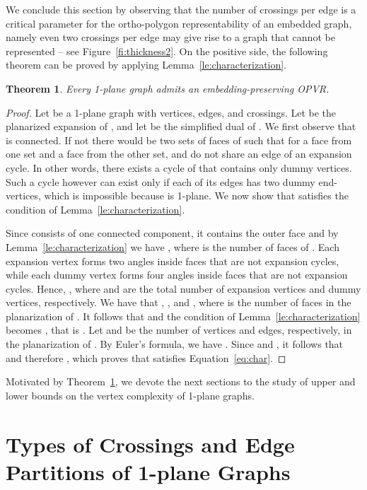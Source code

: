 \documentclass{article}
\newtheorem{theorem}{Theorem}
\newcommand{\opvr}{OPVR\xspace}
\begin{document}
We conclude this section by observing that the number of crossings per edge is a critical parameter for the ortho-polygon representability of an embedded graph, namely even two crossings per edge may give rise to a graph that cannot be represented -- see Figure~\ref{fi:thickness2}. On the positive side, the following theorem can be proved by applying Lemma~\ref{le:characterization}.

\begin{theorem}\label{th:1-planar}
Every 1-plane graph admits an embedding-preserving \opvr.
\end{theorem}
\begin{proof}
Let  be a 1-plane graph with  vertices,  edges, and  crossings.
Let  be the planarized expansion of , and let  be the simplified dual of . We first observe that  is connected. If not  there would be two sets of faces of  such that for a face  from one set and a face  from the other set,  and  do not share an edge of an expansion cycle. In other words, there exists  a cycle of  that contains only dummy vertices. Such a cycle however can exist only if each of its edges has two dummy end-vertices, which is impossible because  is 1-plane. We now show that  satisfies the condition of Lemma~\ref{le:characterization}.

Since  consists of one connected component, it contains the outer face and by Lemma~\ref{le:characterization} we have , where  is the number of faces of .  Each expansion vertex forms two angles inside faces that are not expansion cycles, while each dummy vertex forms four angles inside faces that are not expansion cycles. Hence, , where  and  are the total number of expansion vertices and dummy vertices, respectively. We have that , , and ,  where  is the number of faces in the planarization of .
 It follows that  and the condition of Lemma~\ref{le:characterization} becomes , that is . Let  and  be the number of vertices and edges, respectively, in the planarization of . By  Euler's formula, we have . Since  and , it follows that  and therefore , which proves that  satisfies Equation~\ref{eq:char}.
\end{proof}


Motivated by Theorem~\ref{th:1-planar}, we devote the next sections to the study of upper and lower bounds on the vertex complexity of 1-plane graphs. 



\section{Types of Crossings and Edge Partitions of 1-plane Graphs}\label{se:background-edgepartitions}
\end{document}
